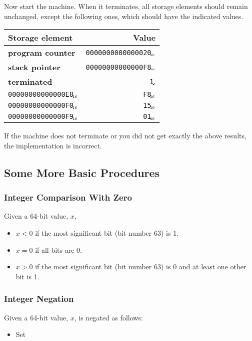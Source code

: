 \documentclass[a4paper,12pt]{article}
\newcommand{\num}[1]{\texttt{#1}\xspace}
\newcommand{\hex}[1]{\num{#1}$_{\textup{\tiny\hskip-1ex 16}}$\xspace}
\newcommand{\bin}[1]{\num{#1}$_{\textup{\tiny\hskip-1ex 2}}$\xspace}
\newcommand{\PC}{\textbf{program counter}\xspace}
\newcommand{\SP}{\textbf{stack pointer}\xspace}
\newcommand{\TERM}{\textbf{terminated}\xspace}
\newcommand{\T}{\bin{1}\xspace}
\begin{document}
Now start the machine.
When it terminates, all storage elements should remain unchanged, except the following ones, which should have the indicated values.

\begin{center}
  \begin{tabular}{@{}lr@{}}
    \hline
    Storage element        & Value                   \\
    \hline
    \PC                    & \hex{0000000000000020}  \\
    \SP                    & \hex{00000000000000F8}  \\
    \TERM                  & \T                      \\
    \hex{00000000000000E8} & \hex{F8} \\
    \hex{00000000000000F0} & \hex{15} \\
    \hex{00000000000000F9} & \hex{01} \\
    \hline
  \end{tabular}
\end{center}

If the machine does not terminate or you did not get exactly the above results, the implementation is incorrect.


\subsection{Some More Basic Procedures}

\subsubsection{Integer Comparison With Zero}

Given a 64-bit value, $x$,
\begin{itemize}
\item $x < 0$ if the most significant bit (bit number 63) is 1.
\item $x = 0$ if all bits are 0.
\item $x > 0$ if the most significant bit (bit number 63) is 0 and at least one other bit is 1.
\end{itemize}

\subsubsection{Integer Negation}

Given a 64-bit value, $x$, is negated as follows:
\begin{itemize}
\item Set 
\end{itemize}
\end{document}
